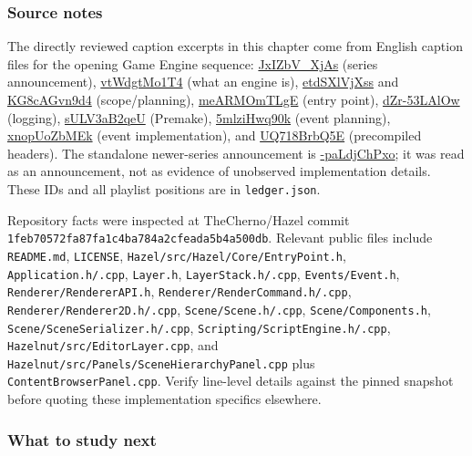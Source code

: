 \subsubsection{Source notes}\label{06-engine-ii-ch042-source-notes}

\hypertarget{06-engine-ii-ch042-source-notes}{}

The directly reviewed caption excerpts in this chapter come from English caption files for the opening Game Engine sequence: \href{https://www.youtube.com/watch?v=JxIZbV_XjAs}{JxIZbV\_XjAs} (series announcement), \href{https://www.youtube.com/watch?v=vtWdgtMo1T4}{vtWdgtMo1T4} (what an engine is), \href{https://www.youtube.com/watch?v=etdSXlVjXss}{etdSXlVjXss} and \href{https://www.youtube.com/watch?v=KG8cAGvn9d4}{KG8cAGvn9d4} (scope/planning), \href{https://www.youtube.com/watch?v=meARMOmTLgE}{meARMOmTLgE} (entry point), \href{https://www.youtube.com/watch?v=dZr-53LAlOw}{dZr-53LAlOw} (logging), \href{https://www.youtube.com/watch?v=sULV3aB2qeU}{sULV3aB2qeU} (Premake), \href{https://www.youtube.com/watch?v=5mlziHwq90k}{5mlziHwq90k} (event planning), \href{https://www.youtube.com/watch?v=xnopUoZbMEk}{xnopUoZbMEk} (event implementation), and \href{https://www.youtube.com/watch?v=UQ718BrbQ5E}{UQ718BrbQ5E} (precompiled headers). The standalone newer-series announcement is \href{https://www.youtube.com/watch?v=-paLdjChPxo}{-paLdjChPxo}; it was read as an announcement, not as evidence of unobserved implementation details. These IDs and all playlist positions are in \texttt{ledger.json}.

Repository facts were inspected at TheCherno/Hazel commit \texttt{1feb70572fa87fa1c4ba784a2cfeada5b4a500db}. Relevant public files include \texttt{README.md}, \texttt{LICENSE}, \texttt{Hazel/src/Hazel/Core/EntryPoint.h}, \texttt{Application.h/.cpp}, \texttt{Layer.h}, \texttt{LayerStack.h/.cpp}, \texttt{Events/Event.h}, \texttt{Renderer/RendererAPI.h}, \texttt{Renderer/RenderCommand.h/.cpp}, \texttt{Renderer/Renderer2D.h/.cpp}, \texttt{Scene/Scene.h/.cpp}, \texttt{Scene/Components.h}, \texttt{Scene/SceneSerializer.h/.cpp}, \texttt{Scripting/ScriptEngine.h/.cpp}, \texttt{Hazelnut/src/EditorLayer.cpp}, and \texttt{Hazelnut/src/Panels/SceneHierarchyPanel.cpp} plus \texttt{ContentBrowserPanel.cpp}. Verify line-level details against the pinned snapshot before quoting these implementation specifics elsewhere.

\subsubsection{What to study next}\label{06-engine-ii-ch042-what-to-study-next}

